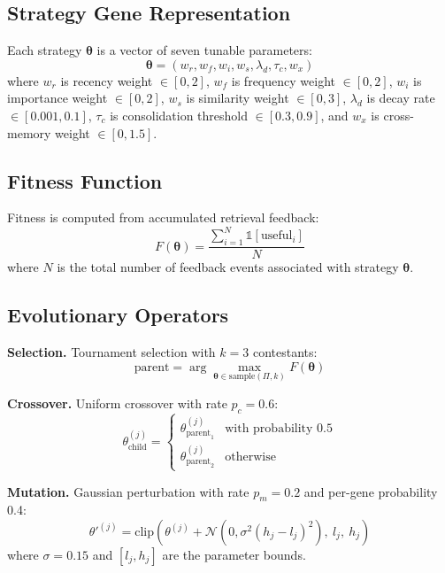 \documentclass[runningheads]{llncs}
\begin{document}
\subsection{Strategy Gene Representation}

Each strategy $\boldsymbol{\theta}$ is a vector of seven tunable parameters:
\begin{equation}\label{eq:genes}
    \boldsymbol{\theta} = (w_r, w_f, w_i, w_s, \lambda_d, \tau_c, w_x)
\end{equation}
where $w_r$ is recency weight $\in [0, 2]$, $w_f$ is frequency weight $\in [0, 2]$, $w_i$ is importance weight $\in [0, 2]$, $w_s$ is similarity weight $\in [0, 3]$, $\lambda_d$ is decay rate $\in [0.001, 0.1]$, $\tau_c$ is consolidation threshold $\in [0.3, 0.9]$, and $w_x$ is cross-memory weight $\in [0, 1.5]$.

\subsection{Fitness Function}

Fitness is computed from accumulated retrieval feedback:
\begin{equation}\label{eq:fitness}
    F(\boldsymbol{\theta}) = \frac{\sum_{i=1}^{N} \mathbb{1}[\text{useful}_i]}{N}
\end{equation}
where $N$ is the total number of feedback events associated with strategy $\boldsymbol{\theta}$.

\subsection{Evolutionary Operators}

\textbf{Selection.} Tournament selection with $k=3$ contestants:
\begin{equation}
    \text{parent} = \arg\max_{\boldsymbol{\theta} \in \text{sample}(\Pi, k)} F(\boldsymbol{\theta})
\end{equation}

\textbf{Crossover.} Uniform crossover with rate $p_c = 0.6$:
\begin{equation}\label{eq:crossover}
    \theta_{\text{child}}^{(j)} = \begin{cases} \theta_{\text{parent}_1}^{(j)} & \text{with probability } 0.5 \\ \theta_{\text{parent}_2}^{(j)} & \text{otherwise} \end{cases}
\end{equation}

\textbf{Mutation.} Gaussian perturbation with rate $p_m = 0.2$ and per-gene probability 0.4:
\begin{equation}\label{eq:mutation}
    \theta'^{(j)} = \text{clip}\left(\theta^{(j)} + \mathcal{N}(0, \sigma^2 (h_j - l_j)^2),\ l_j,\ h_j\right)
\end{equation}
where $\sigma = 0.15$ and $[l_j, h_j]$ are the parameter bounds.
\end{document}
